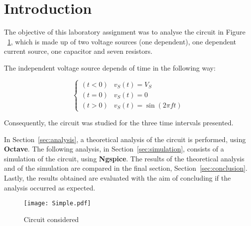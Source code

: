 \section{Introduction}
\label{sec:introduction}

The objective of this laboratory assignment was to analyse the circuit in Figure ~\ref{circuit}, which is made up of two voltage sources (one dependent), one dependent current source, one capacitor and seven resistors.

The independent voltage source depends of time in the following way:

\begin{equation}
  \begin{cases}
    (t < 0) & v_S(t) = V_S \\
    (t = 0) & v_S(t) = 0 \\
    (t > 0) & v_S(t) = \sin(2\pi ft)
  \end{cases}
\end{equation}

Consequently, the circuit was studied for the three time intervals presented.

In Section~\ref{sec:analysis}, a theoretical analysis of the circuit is performed, using {\bf Octave}. The following analysis, in Section~\ref{sec:simulation}, consists of a simulation of the circuit, using {\bf Ngspice}. The results of the theoretical analysis and of the simulation are compared in the final section, Section~\ref{sec:conclusion}. Lastly, the results obtained are evaluated with the aim of concluding if the analysis occurred as expected.




\begin{figure}[H]
  \centering
  \texttt{[image: Simple.pdf]}
  \caption{Circuit considered}
  \label{circuit}
\end{figure}

